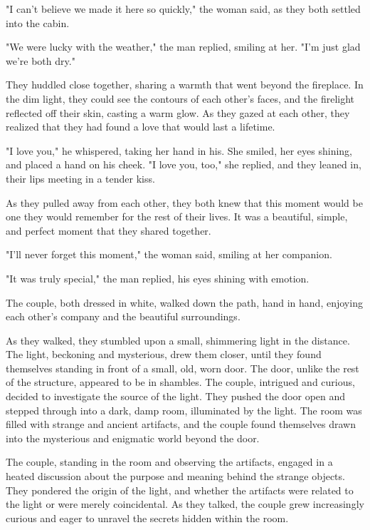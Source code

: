\documentclass[smalldemyvopaper,11pt,twoside,onecolumn,openright,extrafontsizes]{memoir}
\begin{document}
"I can't believe we made it here so quickly," the woman said, as they both settled into the cabin.\par
"We were lucky with the weather," the man replied, smiling at her. "I'm just glad we're both dry."\par
They huddled close together, sharing a warmth that went beyond the fireplace. In the dim light, they could see the contours of each other's faces, and the firelight reflected off their skin, casting a warm glow. As they gazed at each other, they realized that they had found a love that would last a lifetime.\par
"I love you," he whispered, taking her hand in his. She smiled, her eyes shining, and placed a hand on his cheek. "I love you, too," she replied, and they leaned in, their lips meeting in a tender kiss.\par
As they pulled away from each other, they both knew that this moment would be one they would remember for the rest of their lives. It was a beautiful, simple, and perfect moment that they shared together.\par
"I'll never forget this moment," the woman said, smiling at her companion.\par
"It was truly special," the man replied, his eyes shining with emotion.\par
The couple, both dressed in white, walked down the path, hand in hand, enjoying each other's company and the beautiful surroundings.\par
As they walked, they stumbled upon a small, shimmering light in the distance. The light, beckoning and mysterious, drew them closer, until they found themselves standing in front of a small, old, worn door. The door, unlike the rest of the structure, appeared to be in shambles. The couple, intrigued and curious, decided to investigate the source of the light. They pushed the door open and stepped through into a dark, damp room, illuminated by the light. The room was filled with strange and ancient artifacts, and the couple found themselves drawn into the mysterious and enigmatic world beyond the door.\par
The couple, standing in the room and observing the artifacts, engaged in a heated discussion about the purpose and meaning behind the strange objects. They pondered the origin of the light, and whether the artifacts were related to the light or were merely coincidental. As they talked, the couple grew increasingly curious and eager to unravel the secrets hidden within the room.\par
\end{document}
